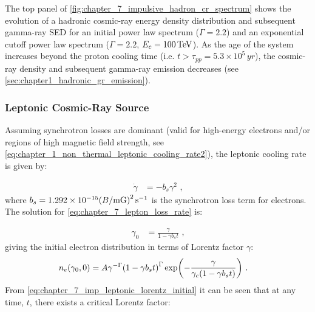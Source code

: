 The top panel of \autoref{fig:chapter_7_impulsive_hadron_cr_spectrum} shows the evolution of a hadronic cosmic-ray energy density distribution and subsequent gamma-ray SED for an initial power law spectrum ($\Gamma=2.2$) and an exponential cutoff power law spectrum ($\Gamma=2.2$, $E_c=100\,\TeV$). As the age of the system increases beyond the proton cooling time (i.e. $t>\tau_{pp}=5.3\times 10^5\,\si{yr}$), the cosmic-ray density and subsequent gamma-ray emission decreases (see \autoref{sec:chapter1_hadronic_gr_emission}).

\subsubsection{Leptonic Cosmic-Ray Source}

Assuming synchrotron losses are dominant (valid for high-energy electrons and/or regions of high magnetic field strength, see \autoref{eq:chapter_1_non_thermal_leptonic_cooling_rate2}), the leptonic cooling rate is given by:

\begin{equation}
    \begin{aligned}
        \dot{\gamma}&=-b_s\gamma^2 \text{ ,}
    \end{aligned}\label{eq:chapter_7_lepton_loss_rate}
\end{equation}
\noindent where $b_s = 1.292 \times 10^{-15} \qty(B/\si{\milli G})^2\,\si{\per\second}$ is the synchrotron loss term for electrons. The solution for \autoref{eq:chapter_7_lepton_loss_rate} is:

\begin{equation}
	\begin{aligned}
		\gamma_0&=\frac{\gamma}{1-\gamma b_s t} \text{ ,}
	\end{aligned} \label{eq:chapter_7_imp_leptonic_lorentz_initial}
\end{equation}
\noindent giving the initial electron distribution in terms of Lorentz factor $\gamma$:
\begin{equation}
    \begin{aligned}
        n_e\qty(\gamma_0,0)&=A\gamma^{-\Gamma}\qty(1-\gamma b_s t)^{\Gamma}\exp(-\frac{\gamma}{\gamma_c\qty(1-\gamma b_st)})\text{ .} 
    \end{aligned} \label{eq:chapter_7_imp_leptonic_cr_initial_distrib}
\end{equation}
\noindent From \autoref{eq:chapter_7_imp_leptonic_lorentz_initial} it can be seen that at any time, $t$, there exists a critical Lorentz factor:

